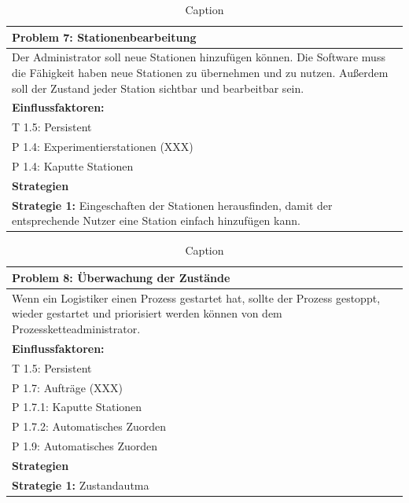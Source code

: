 \documentclass[enabledeprecatedfontcommands,fontsize=12pt,paper=a4,twoside]{scrartcl}
\begin{document}
\begin{table}[H]
    \centering
    \begin{tabular}{|p{15cm}|}
    \hline
          \textbf{Problem 7:} Stationenbearbeitung
          \\ \hline
          Der Administrator soll neue Stationen hinzufügen können. Die Software muss die Fähigkeit haben neue Stationen zu übernehmen und zu nutzen. Außerdem soll der Zustand jeder Station sichtbar und bearbeitbar sein.
          \\ \hline
          \textbf{Einflussfaktoren: } \\
          T 1.5: Persistent \\
          P 1.4: Experimentierstationen (XXX)\\
          P 1.4: Kaputte Stationen\\
          \hline
          \textbf{Strategien} \\ \hline
          \textbf{Strategie 1:} Eingeschaften der Stationen herausfinden, damit der entsprechende Nutzer eine Station einfach hinzufügen kann.
          \\ \hline
    \end{tabular}
    \caption{Caption}
    \label{tab:my_label}
\end{table}

\begin{table}[H]
    \centering
    \begin{tabular}{|p{15cm}|}
    \hline
          \textbf{Problem 8:} Überwachung der Zustände
          \\ \hline
          Wenn ein Logistiker einen Prozess gestartet hat, sollte der Prozess gestoppt, wieder gestartet und priorisiert werden können von dem Prozessketteadministrator.
          \\ \hline
          \textbf{Einflussfaktoren: } \\
          T 1.5: Persistent \\
          P 1.7: Aufträge (XXX)\\
          P 1.7.1: Kaputte Stationen\\
          P 1.7.2: Automatisches Zuorden\\
          P 1.9: Automatisches Zuorden\\
          \hline
          \textbf{Strategien} \\ \hline
          \textbf{Strategie 1:} Zustandautma
          \\ \hline
    \end{tabular}
    \caption{Caption}
    \label{tab:my_label}
\end{table}
\end{document}
